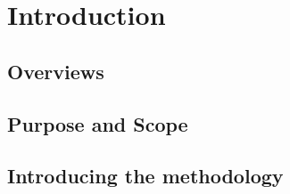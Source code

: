 \chapter{Introduction}
\label{chap:introduction}

\section{Overviews}

\section{Purpose and Scope}

\section{Introducing the methodology}